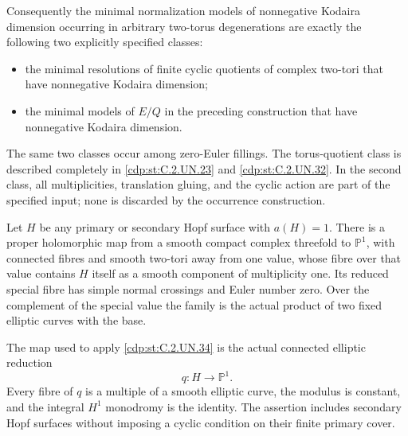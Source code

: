 \begin{proposition}
Consequently the minimal normalization models of
nonnegative Kodaira dimension occurring in arbitrary
two-torus degenerations are exactly the following
two explicitly specified classes:
\begin{itemize}
\item the minimal resolutions of finite cyclic
quotients of complex two-tori that have nonnegative
Kodaira dimension;
\item the minimal models of $E/Q$ in the preceding
construction that have nonnegative Kodaira dimension.
\end{itemize}
The same two classes occur among zero-Euler fillings.
The torus-quotient class is described completely in
\ref{cdp:st:C.2.UN.23} and \ref{cdp:st:C.2.UN.32}. In the second class, all multiplicities,
translation gluing, and the cyclic action are part
of the specified input; none is discarded by the
occurrence construction.
\end{proposition}

\begin{proposition}\label{cdp:st:C.2.UN.37}

Let $H$ be any primary or secondary Hopf surface with $a(H)=1$.
There is a proper holomorphic map from a smooth compact complex
threefold to $\mathbb P^1$, with connected fibres and smooth
two-tori away from one value, whose fibre over that value contains
$H$ itself as a smooth component of multiplicity one. Its reduced
special fibre has simple normal crossings and Euler number zero.
Over the complement of the special value the family is the
actual product of two fixed elliptic curves with the base.

The map used to apply \ref{cdp:st:C.2.UN.34} is the actual connected elliptic
reduction
\[
                         q:H\longrightarrow\mathbb P^1.
\tag{C.EH.1}\label{cdp:eq:C.EH.1}
\]
Every fibre of $q$ is a multiple of a smooth elliptic curve,
the modulus is constant, and the integral $H^1$ monodromy is
the identity. The assertion includes secondary Hopf surfaces
without imposing a cyclic condition on their finite primary cover.
\end{proposition}


